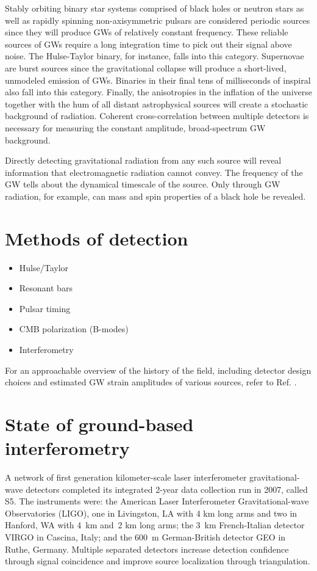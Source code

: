 Stably orbiting binary star systems comprised of black holes or
neutron stars as well as rapidly spinning non-axisymmetric pulsars are
considered periodic sources since they will produce GWs
of relatively constant frequency. These reliable sources of GWs
require a long integration time to pick out their signal above
noise. The Hulse-Taylor binary, for instance, falls into this
category. Supernovae are burst sources since the gravitational
collapse will produce a short-lived, unmodeled emission of
GWs. Binaries in their final tens of milliseconds of inspiral also
fall into this category. Finally, the anisotropies in the inflation of
the universe together with the hum of all distant astrophysical
sources will create a stochastic background of radiation. Coherent
cross-correlation between multiple detectors is necessary for
measuring the constant amplitude, broad-spectrum GW background.

Directly detecting gravitational radiation from any such source will
reveal information that electromagnetic radiation cannot convey. The
frequency of the GW tells about the dynamical timescale of the
source. Only through GW radiation, for example, can mass and spin
properties of a black hole be revealed.





\section{Methods of detection}
\begin{itemize}
\item Hulse/Taylor
\item Resonant bars
\item Pulsar timing
\item CMB polarization (B-modes)
\item Interferometry
\end{itemize}
For an approachable overview of the history of the field, including
detector design choices and estimated GW strain amplitudes of various
sources, refer to Ref. \cite{Linsay1983Study}.






\section{State of ground-based interferometry}
A network of first generation kilometer-scale laser interferometer
gravitational-wave detectors completed its integrated 2-year data
collection run in 2007, called S5. The instruments were: the American
Laser Interferometer Gravitational-wave Observatories (LIGO)\cite{Abbott2009LIGO},
one in Livingston, LA with 4 km long arms and two in Hanford, WA with
4~km and~2 km long arms; the 3~km French-Italian detector
VIRGO\cite{Acernese2008Virgo} in Cascina, Italy; and the 600~m
German-British detector GEO\cite{Luck2006Status} in Ruthe, Germany. Multiple
separated detectors increase detection confidence through signal
coincidence and improve source localization through triangulation.

